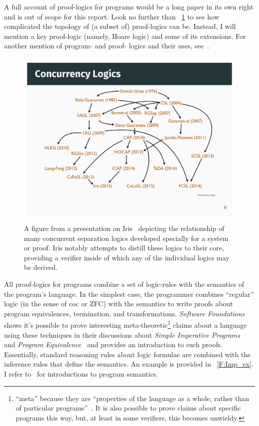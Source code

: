A full account of proof-logics for programs would be a long paper in its own
right and is out of scope for this report. Look no further than
\figurename~\ref{F:iris_complex} to see how complicated the topology of (a
subset of) proof-logics can be. Instead, I will mention a key proof-logic
(namely, Hoare logic) and some of its extensions. For another mention of
program- and proof- logics and their uses, see~\cite[\S 5]{Appel_2011}.

\begin{figure}
    \centering
    \includegraphics[width=\textwidth]{img/iris_2_0_concurrent_logics}
    \caption{A figure from a presentation on Iris~\cite{Jung_2016_slides}
    depicting the relationship of many concurrent separation logics developed
    specially for a system or proof. Iris notably attempts to distill these
    logics to their core, providing a verifier inside of which any of the
    individual logics may be derived.}\label{F:iris_complex}
\end{figure}

All proof-logics for programs combine a set of logic-rules with the semantics of
the program's language. In the simplest case, the programmer combines
``regular'' logic (in the sense of \gls{coc} or ZFC) with the semantics to write
proofs about program equivalences, termination, and transformations.
\emph{Software Foundations} shows it's possible to prove interesting
meta-theoretic\footnote{``meta'' because they are ``properties of the language
as a whole, rather than of particular programs''~\cite{Pierce:SF2}. It is also
possible to prove claims about specific programs this way, but, at least in some
verifiers, this becomes unwieldy.} claims about a language using these techniques
in their discussions about \emph{Simple Imperative Programs}~\cite{Pierce:SF1}
and \emph{Program Equivalence}~\cite{Pierce:SF2} and provides an introduction to
such proofs. Essentially, standard reasoning rules about logic formulae are
combined with the inference rules that define the semantics. An example is
provided in \figurename~\ref{F:Imp_ex}. I refer
to~\cite{Winskel_1993,Harper_2016} for introductions to program semantics.

